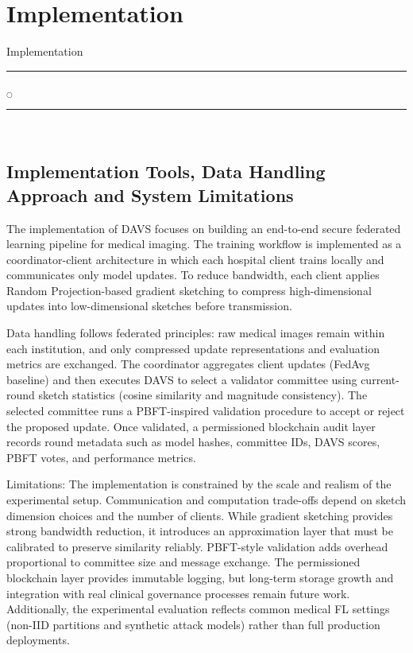 
\chapter[Implementation]{Implementation}{Implementation}\label{im}

\noindent
\rule{0.49\textwidth}{0.75pt} $_{\bigcirc}$ \rule{0.49\textwidth}{0.75pt}\\


\section{Implementation Tools, Data Handling Approach and System Limitations}
The implementation of DAVS focuses on building an end-to-end secure federated learning pipeline for medical imaging. The training workflow is implemented as a coordinator-client architecture in which each hospital client trains locally and communicates only model updates. To reduce bandwidth, each client applies Random Projection-based gradient sketching to compress high-dimensional updates into low-dimensional sketches before transmission.

Data handling follows federated principles: raw medical images remain within each institution, and only compressed update representations and evaluation metrics are exchanged. The coordinator aggregates client updates (FedAvg baseline) and then executes DAVS to select a validator committee using current-round sketch statistics (cosine similarity and magnitude consistency). The selected committee runs a PBFT-inspired validation procedure to accept or reject the proposed update. Once validated, a permissioned blockchain audit layer records round metadata such as model hashes, committee IDs, DAVS scores, PBFT votes, and performance metrics.

Limitations:
The implementation is constrained by the scale and realism of the experimental setup. Communication and computation trade-offs depend on sketch dimension choices and the number of clients. While gradient sketching provides strong bandwidth reduction, it introduces an approximation layer that must be calibrated to preserve similarity reliably. PBFT-style validation adds overhead proportional to committee size and message exchange. The permissioned blockchain layer provides immutable logging, but long-term storage growth and integration with real clinical governance processes remain future work. Additionally, the experimental evaluation reflects common medical FL settings (non-IID partitions and synthetic attack models) rather than full production deployments.

